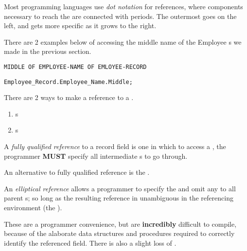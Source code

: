 \begin{definition}\label{def:Record_Data_Type_Field_Access-Dot_Notation}
  Most programming languages use \emph{dot notation} for  references, where components necessary to reach the  are connected with periods.
  The outermost  goes on the left, and gets more specific as it grows to the right.
\end{definition}

There are 2 examples below of accessing the middle name of the Employee s we made in the previous section.

\begin{verbatim}
MIDDLE OF EMPLOYEE-NAME OF EMLOYEE-RECORD
\end{verbatim}

\begin{verbatim}
Employee_Record.Employee_Name.Middle;
\end{verbatim}

There are 2 ways to make a reference to a  .
\begin{enumerate}[noitemsep]
\item {}s
\item {}s
\end{enumerate}

\begin{definition}\label{def:Fully_Qualified_Reference}
  A \emph{fully qualified reference} to a record field is one in which to access a , the programmer \textbf{MUST} specify all intermediate s to go through.

  An alternative to fully qualified reference is the .
\end{definition}

\begin{definition}\label{def:Elliptical_Reference}
  An \emph{elliptical reference} allows a programmer to specify the  and omit any to all parent s; so long as the resulting reference in unambiguous in the referencing environment (the ).

  These are a programmer convenience, but are \textbf{incredibly} difficult to compile, because of the alaborate data structures and procedures required to correctly identify the referenced field.
  There is also a slight loss of .
\end{definition}


